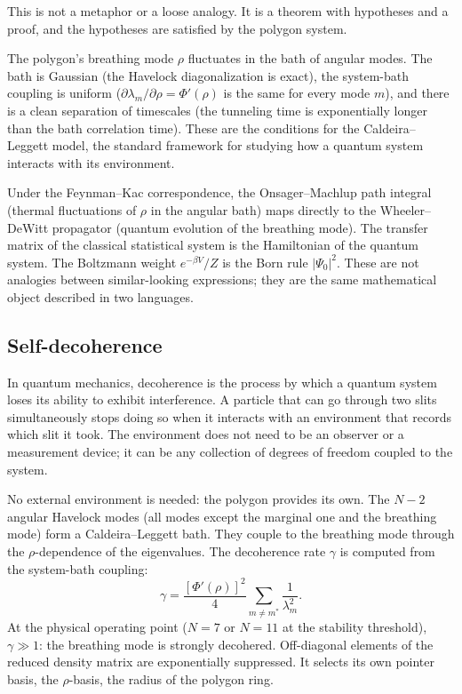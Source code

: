 This is not a metaphor or a loose analogy. It is a theorem with
hypotheses and a proof, and the hypotheses are satisfied by the polygon
system.

The polygon's breathing mode $\rho$ fluctuates in the bath of angular
modes. The bath is Gaussian (the Havelock diagonalization is exact), the
system-bath coupling is uniform ($\partial\lambda_m/\partial\rho =
\Phi'(\rho)$ is the same for every mode $m$), and there is a clean
separation of timescales (the tunneling time is exponentially longer than
the bath correlation time). These are the conditions for the
Caldeira--Leggett model, the standard framework for studying how a
quantum system interacts with its environment.

Under the Feynman--Kac correspondence, the Onsager--Machlup path
integral (thermal fluctuations of $\rho$ in the angular bath) maps
directly to the Wheeler--DeWitt propagator (quantum evolution of the
breathing mode). The transfer matrix of the classical statistical system
is the Hamiltonian of the quantum system. The Boltzmann weight
$e^{-\beta V}/Z$ is the Born rule $|\Psi_0|^2$. These are not
analogies between similar-looking expressions; they are the same
mathematical object described in two languages.

\subsection*{Self-decoherence}

In quantum mechanics, decoherence is the process by which a quantum
system loses its ability to exhibit interference. A particle that can
go through two slits simultaneously stops doing so when it interacts with
an environment that records which slit it took. The environment does not
need to be an observer or a measurement device; it can be any collection
of degrees of freedom coupled to the system.

No external environment is needed: the polygon provides its own. The $N - 2$ angular Havelock
modes (all modes except the marginal one and the breathing mode) form a
Caldeira--Leggett bath. They couple to the breathing mode through the
$\rho$-dependence of the eigenvalues. The decoherence rate $\gamma$ is
computed from the system-bath coupling:
\[
  \gamma = \frac{[\Phi'(\rho)]^2}{4}
  \sum_{m \ne m^*} \frac{1}{\lambda_m^2}.
\]
At the physical operating point ($N = 7$ or $N = 11$ at the stability
threshold), $\gamma \gg 1$: the breathing mode is strongly decohered.
Off-diagonal elements of the reduced density matrix are exponentially
suppressed. It selects its own pointer basis, the $\rho$-basis,
the radius of the polygon ring.

